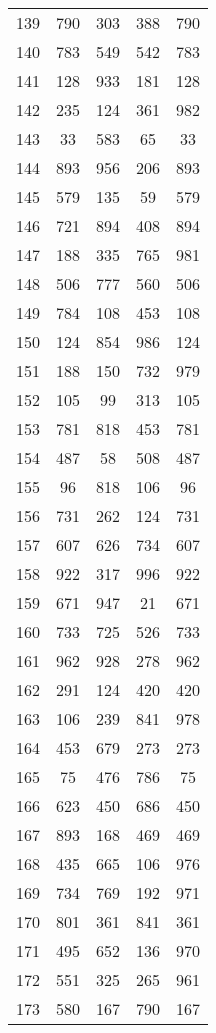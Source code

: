 \documentclass[a4paper,10pt,ngerman]{scrartcl}
\begin{document}
\begin{longtable}[c]{c|c|c|c|c}
    139 & 790 & 303 & 388 & 790 \\
    140 & 783 & 549 & 542 & 783 \\
    141 & 128 & 933 & 181 & 128 \\
    142 & 235 & 124 & 361 & 982 \\
    143 & 33 & 583 & 65 & 33 \\
    144 & 893 & 956 & 206 & 893 \\
    145 & 579 & 135 & 59 & 579 \\
    146 & 721 & 894 & 408 & 894 \\
    147 & 188 & 335 & 765 & 981 \\
    148 & 506 & 777 & 560 & 506 \\
    149 & 784 & 108 & 453 & 108 \\
    150 & 124 & 854 & 986 & 124 \\
    151 & 188 & 150 & 732 & 979 \\
    152 & 105 & 99 & 313 & 105 \\
    153 & 781 & 818 & 453 & 781 \\
    154 & 487 & 58 & 508 & 487 \\
    155 & 96 & 818 & 106 & 96 \\
    156 & 731 & 262 & 124 & 731 \\
    157 & 607 & 626 & 734 & 607 \\
    158 & 922 & 317 & 996 & 922 \\
    159 & 671 & 947 & 21 & 671 \\
    160 & 733 & 725 & 526 & 733 \\
    161 & 962 & 928 & 278 & 962 \\
    162 & 291 & 124 & 420 & 420 \\
    163 & 106 & 239 & 841 & 978 \\
    164 & 453 & 679 & 273 & 273 \\
    165 & 75 & 476 & 786 & 75 \\
    166 & 623 & 450 & 686 & 450 \\
    167 & 893 & 168 & 469 & 469 \\
    168 & 435 & 665 & 106 & 976 \\
    169 & 734 & 769 & 192 & 971 \\
    170 & 801 & 361 & 841 & 361 \\
    171 & 495 & 652 & 136 & 970 \\
    172 & 551 & 325 & 265 & 961 \\
    173 & 580 & 167 & 790 & 167 \\

\end{longtable}
\end{document}
